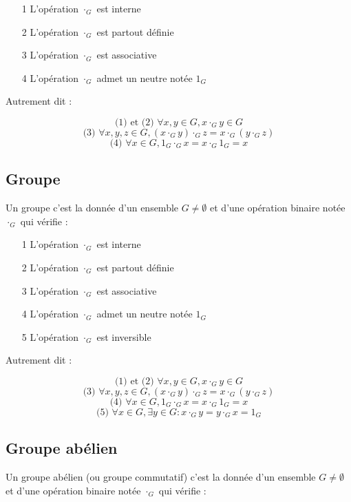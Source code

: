 \documentclass[a4paper,10pt]{article}
\begin{document}
\begin{itemize}
 \item[1]{L'opération $\cdot_G$ est interne}
 \item[2]{L'opération $\cdot_G$ est partout définie}
 \item[3]{L'opération $\cdot_G$ est associative}
 \item[4]{L'opération $\cdot_G$ admet un neutre notée $1_G$}
\end{itemize}

Autrement dit :

$$\mbox{(1) et (2) }\forall x,y \in G, x \cdot_G y \in G$$
$$\mbox{(3) } \forall x,y,z \in G, ( x \cdot_G y ) \cdot_G z = x \cdot_G ( y \cdot_G z )$$
$$\mbox{(4) } \forall x \in G, 1_G \cdot_G x = x \cdot_G 1_G = x$$

\subsection{Groupe}

Un groupe c'est la donnée d'un ensemble $G \neq \emptyset$ et d'une opération binaire notée $\cdot_G$ qui vérifie :

\begin{itemize}
 \item[1]{L'opération $\cdot_G$ est interne}
 \item[2]{L'opération $\cdot_G$ est partout définie}
 \item[3]{L'opération $\cdot_G$ est associative}
 \item[4]{L'opération $\cdot_G$ admet un neutre notée $1_G$}
 \item[5]{L'opération $\cdot_G$ est inversible}
\end{itemize}

Autrement dit :

$$\mbox{(1) et (2) }\forall x,y \in G, x \cdot_G y \in G$$
$$\mbox{(3) } \forall x,y,z \in G, ( x \cdot_G y ) \cdot_G z = x \cdot_G ( y \cdot_G z )$$
$$\mbox{(4) } \forall x \in G, 1_G \cdot_G x = x \cdot_G 1_G = x$$
$$\mbox{(5) } \forall x \in G, \exists y \in G : x \cdot_G y = y \cdot_G x = 1_G$$

\newpage

\subsection{Groupe abélien}

Un groupe abélien (ou groupe commutatif) c'est la donnée d'un ensemble $G \neq \emptyset$ et d'une opération binaire notée $\cdot_G$ qui vérifie :
\end{document}
